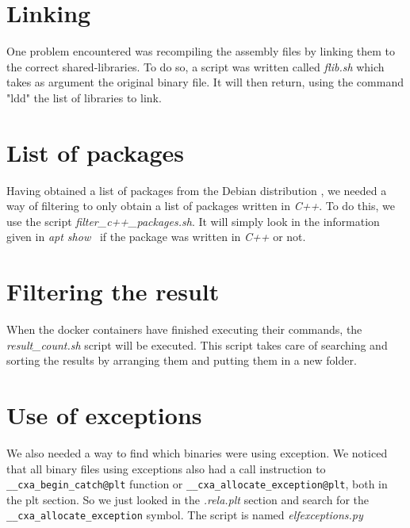 \documentclass[a4paper,11pt,oneside]{report}
\begin{document}
\section{Linking}
One problem encountered was recompiling the
assembly files by linking them to the correct shared-libraries. To do so, a 
script was written called  \textit{flib.sh} which takes as argument the original binary
file. It will then return, using the command "ldd"\cite{ldd} the list of
libraries to link. 

\section{List of packages}

Having obtained a list of packages from the Debian distribution
\cite{sourcePackage}, we needed a way of filtering to only obtain
a list of packages written in \textit{C++}. To do this, we use the script
\textit{filter\_c++\_packages.sh}. It will simply look in the information given
in \textit{apt show}~\cite{apt} if the package was written in \textit{C++} or
not. 

\section{Filtering the result}
When the docker containers have finished executing their commands, the
\textit{result\_count.sh} script will be executed. This script takes care of searching
and sorting the results by arranging them and putting them in a new folder.

\section{Use of exceptions}
We also needed a way to find which binaries were using exception. We noticed
that all binary files using exceptions also had a call instruction to
\verb|__cxa_begin_catch@plt| function or
\verb|__cxa_allocate_exception@plt|, both in the plt section.
So we just looked in the \textit{.rela.plt} section and search for the
\verb|__cxa_allocate_exception| symbol. The script is named \textit{elfexceptions.py}


\end{document}
